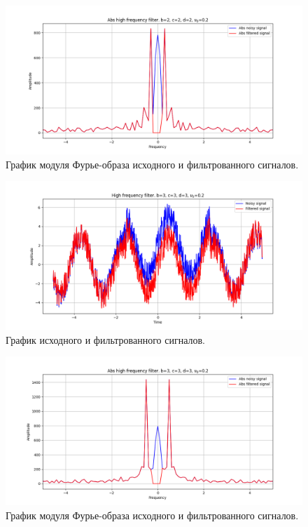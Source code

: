 \documentclass[a4paper, 12pt]{article}
\begin{document}
    \begin{figure}[!htb]
        \centering
        \includegraphics[scale=0.485]{23_abs_u_U_nolow.png}
        \captionsetup{skip=0pt}
        \caption{График модуля Фурье-образа исходного и фильтрованного сигналов.}
        \label{fig:fig_d}
    \end{figure}
    \begin{figure}[!htb]
        \centering
        \includegraphics[scale=0.485]{24_u_flt_u_nolow.png}
        \captionsetup{skip=0pt}
        \caption{График исходного и фильтрованного сигналов.}
        \label{fig:fig_e}
    \end{figure}
    \begin{figure}[!htb]
        \centering
        \includegraphics[scale=0.485]{24_abs_u_U_nolow.png}
        \captionsetup{skip=0pt}
        \caption{График модуля Фурье-образа исходного и фильтрованного сигналов.}
        \label{fig:fig_f}
    \end{figure}
\end{document}
